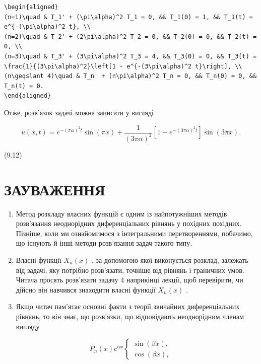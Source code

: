 \documentclass[
  ukrainian,
]{article}
\begin{document}
\begin{verbatim}
\begin{aligned}
(n=1)\quad & T_1' + (\pi\alpha)^2 T_1 = 0, && T_1(0) = 1, && T_1(t) = e^{-(\pi\alpha)^2 t}, \\
(n=2)\quad & T_2' + (2\pi\alpha)^2 T_2 = 0, && T_2(0) = 0, && T_2(t) = 0, \\
(n=3)\quad & T_3' + (3\pi\alpha)^2 T_3 = 4, && T_3(0) = 0, && T_3(t) = \frac{1}{(3\pi\alpha)^2}\left[1 - e^{-(3\pi\alpha)^2 t}\right], \\
(n\geqslant 4)\quad & T_n' + (n\pi\alpha)^2 T_n = 0, && T_n(0) = 0, && T_n(t) = 0.
\end{aligned}
\end{verbatim}

Отже, розв'язок задачі можна записати у вигляді

\[
u(x, t) = e^{-(\pi\alpha)^2 t} \sin(\pi x) + \frac{1}{(3\pi\alpha)^2} [1 - e^{-(3\pi\alpha)^2 t}] \sin(3\pi x).
\]

(9.12)

\section{ЗАУВАЖЕННЯ}\label{ux437ux430ux443ux432ux430ux436ux435ux43dux43dux44f-6}

\begin{enumerate}
\def\labelenumi{\arabic{enumi}.}
\item
  Метод розкладу власних функцій є одним із найпотужніших методів
  розв'язання неоднорідних диференціальних рівнянь у похідних похідних.
  Пізніше, коли ми ознайомимося з інтегральними перетвореннями,
  побачимо, що існують й інші методи розв'язання задач такого типу.
\item
  Власні функції \(X_n(x)\) , за допомогою якої виконується розклад,
  залежать від задачі, яку потрібно розв'язати, точніше від рівнянь і
  граничних умов. Читача просять розв'язати задачу 4 наприкінці лекції,
  щоб перевірити, чи дійсно він навчився знаходити власні функції
  \(X_n(x)\) .
\item
  Якщо читач пам'ятає основні факти з теорії звичайних диференціальних
  рівнянь, то він знає, що розв'язки, що відповідають неоднорідним
  членам вигляду
\end{enumerate}

\[
P_n(x) e^{\alpha x}
\begin{cases} \sin{(\beta x)}, \\ \cos{(\beta x)}, \end{cases}
\]
\end{document}
